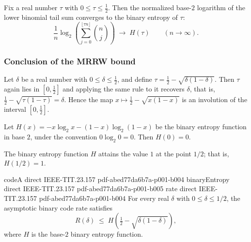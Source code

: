\begin{theorem}
\label{binomial_tail_entropy_asymptotic}
Fix a real number $\tau$ with $0 \le \tau \le \tfrac12$. Then the normalized base-$2$
logarithm of the lower binomial tail sum converges to the binary entropy of $\tau$:
\[
  \frac{1}{n}\log_2\!\left(\sum_{j=0}^{\lfloor \tau n\rfloor} \binom{n}{j}\right)
  \;\longrightarrow\; H(\tau)
  \qquad (n \to \infty).
\]
\end{theorem}

\subsubsection{Conclusion of the MRRW bound}

\begin{theorem}
\label{delta_tau_involution}
\leanok
{}
Let $\delta$ be a real number with $0 \le \delta \le \tfrac12$, and define $\tau =
\tfrac12 - \sqrt{\delta(1-\delta)}$. Then $\tau$ again lies in $[0,\tfrac12]$ and
applying the same rule to it recovers $\delta$, that is, $\tfrac12 - \sqrt{\tau(1-\tau)}
= \delta$. Hence the map $x \mapsto \tfrac12 - \sqrt{x(1-x)}$ is an involution of the
interval $[0,\tfrac12]$.
\end{theorem}

\begin{theorem}
\label{binaryEntropy_zero}
\leanok
{}
Let $H(x) = -x\log_2 x - (1-x)\log_2(1-x)$ be the binary entropy function in base $2$,
under the convention $0\log_2 0 = 0$. Then $H(0) = 0$.
\end{theorem}

\begin{theorem}
\label{binaryEntropy_half}
\leanok
{}
The binary entropy function $H$ attains the value $1$ at the point $1/2$; that is,
$H(1/2) = 1$.
\end{theorem}

\begin{theorem}
\label{mrrw_bound}
\proofstep
  {codeA}
  {direct}
  {IEEE-TIT.23.157}
  {pdf-abed77da6b7a-p001-b004}
\proofstep
  {binaryEntropy}
  {direct}
  {IEEE-TIT.23.157}
  {pdf-abed77da6b7a-p001-b005}
\proofstep
  {rate}
  {direct}
  {IEEE-TIT.23.157}
  {pdf-abed77da6b7a-p001-b004}
For every real $\delta$ with $0 \le \delta \le 1/2$, the asymptotic binary code rate
satisfies
\[
  R(\delta) \;\le\; H\!\left(\tfrac12 - \sqrt{\delta(1-\delta)}\right),
\]
where $H$ is the base-$2$ binary entropy function.
\end{theorem}
